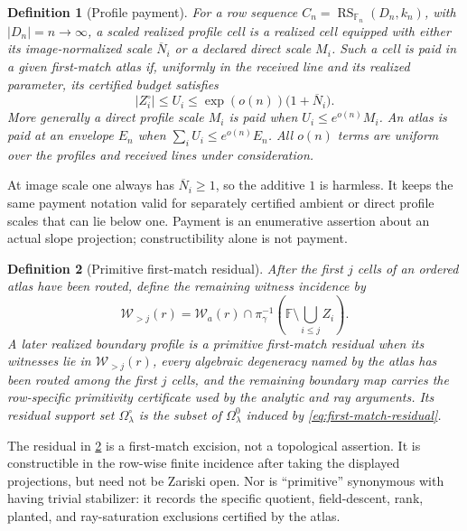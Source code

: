 \documentclass[12pt,a4paper]{amsart}
\numberwithin{equation}{section}
\newtheorem{definition}[definition]{Definition}
\theoremstyle{remark}
\DeclareMathOperator{\RS}{RS}
\newcommand{\F}{\mathbb F}
\newcommand{\Omc}{\Omega^{\circ}}
\newcommand{\Wcal}{\mathcal W}
\newcommand{\barN}{\overline N}
\newcommand{\abs}[1]{\lvert #1\rvert}
\begin{document}
\begin{definition}[Profile payment]
\label{def:profile-payment}
For a row sequence \(C_n=\RS_{\F_n}(D_n,k_n)\), with
\(\abs{D_n}=n\to\infty\), a \emph{scaled realized profile cell} is a
realized cell equipped with either its image-normalized scale \(\barN_i\)
or a declared direct scale \(M_i\).  Such a cell is \emph{paid} in a
given first-match atlas if, uniformly in the received line and its realized
parameter, its certified budget satisfies
\[
 \abs{Z_i^\circ}\le U_i
   \le \exp(o(n))\bigl(1+\barN_i\bigr).
 \tag{2.4}\label{eq:profile-payment}
\]
More generally a direct profile scale \(M_i\) is paid when
\(U_i\le e^{o(n)}M_i\).  An atlas is paid at an envelope \(E_n\) when
\(\sum_iU_i\le e^{o(n)}E_n\).  All \(o(n)\) terms are uniform over the
profiles and received lines under consideration.
\end{definition}

At image scale one always has \(\barN_i\ge1\), so the additive \(1\) is
harmless.  It keeps the same payment notation valid for separately
certified ambient or direct profile scales that can lie below one.
Payment is an enumerative assertion about an actual slope projection;
constructibility alone is not payment.

\begin{definition}[Primitive first-match residual]
\label{def:primitive-first-match-residual}
After the first \(j\) cells of an ordered atlas have been routed, define
the remaining witness incidence by
\[
 \Wcal_{>j}(r)=
 \Wcal_a(r)\cap
 \pi_\gamma^{-1}\!\left(\F\setminus\bigcup_{i\le j}Z_i\right).
 \tag{2.5}\label{eq:first-match-residual}
\]
A later realized boundary profile is a \emph{primitive first-match
residual} when its witnesses lie in \(\Wcal_{>j}(r)\), every algebraic
degeneracy named by the atlas has been routed among the first \(j\) cells,
and the remaining boundary map carries the row-specific primitivity
certificate used by the analytic and ray arguments.  Its residual support
set \(\Omc_\lambda\) is the subset of
\(\Omega^0_\lambda\) induced by \eqref{eq:first-match-residual}.
\end{definition}

The residual in \cref{def:primitive-first-match-residual} is a
first-match excision, not a topological assertion.  It is constructible in
the row-wise finite incidence after taking the displayed projections, but
need not be Zariski open.  Nor is ``primitive'' synonymous with having
trivial stabilizer: it records the specific quotient, field-descent, rank,
planted, and ray-saturation exclusions certified by the atlas.
\end{document}
